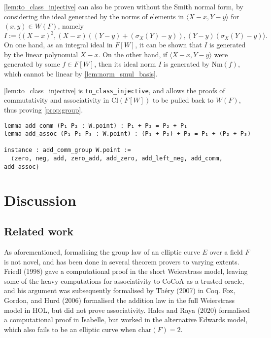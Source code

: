 \documentclass[a4paper,UKenglish,cleveref,autoref,thm-restate]{lipics-v2021}
\begin{document}
\begin{remark}
\cref{lem:to_class_injective} can also be proven without the Smith normal form, by considering the ideal generated by the norms of elements in $ \langle X - x, Y - y \rangle $ for $ (x, y) \in W(F) $, namely
\[ I := \langle (X - x)^2, (X - x)((Y - y) + (\sigma_X(Y) - y)), (Y - y)(\sigma_X(Y) - y) \rangle. \]
On one hand, as an integral ideal in $ F[W] $, it can be shown that $ I $ is generated by the linear polynomial $ X - x $. On the other hand, if $ \langle X - x, Y - y \rangle $ were generated by some $ f \in F[W] $, then its ideal norm $ I $ is generated by $ \mathrm{Nm}(f) $, which cannot be linear by \cref{lem:norm_smul_basis}.
\end{remark}

\cref{lem:to_class_injective} is \texttt{to\_class\_injective}, and allows the proofs of commutativity and associativity in $ \mathrm{Cl}(F[W]) $ to be pulled back to $ W(F) $, thus proving \cref{prop:group}.
\begin{lstlisting}
lemma add_comm (P₁ P₂ : W.point) : P₁ + P₂ = P₂ + P₁
lemma add_assoc (P₁ P₂ P₃ : W.point) : (P₁ + P₂) + P₃ = P₁ + (P₂ + P₃)

instance : add_comm_group W.point :=
  ⟨zero, neg, add, zero_add, add_zero, add_left_neg, add_comm, add_assoc⟩
\end{lstlisting}

\pagebreak

\section{Discussion}
\label{sec:discuss}

\subsection{Related work}
\label{sec:relate}

As aforementioned, formalising the group law of an elliptic curve $ E $ over a field $ F $ is not novel, and has been done in several theorem provers to varying extents. Friedl (1998) \cite{friedl} gave a computational proof in the short Weierstrass model, leaving some of the heavy computations for associativity to CoCoA as a trusted oracle, and his argument was subsequently formalised by Th\'ery (2007) \cite{thery} in Coq. Fox, Gordon, and Hurd (2006) \cite{fox} formalised the addition law in the full Weierstrass model in HOL, but did not prove associativity. Hales and Raya (2020) \cite{hales} formalised a computational proof in Isabelle, but worked in the alternative Edwards model, which also fails to be an elliptic curve when $ \mathrm{char}(F) = 2 $.
\end{document}
